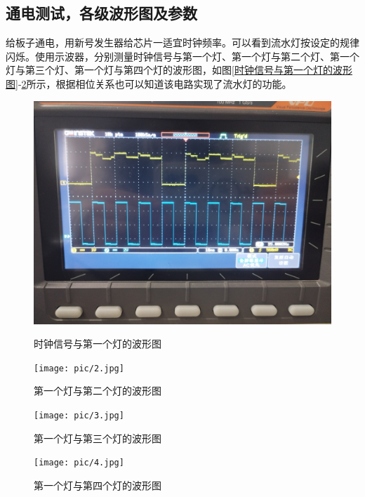 \documentclass{ctexart}
\begin{document}
\subsection{通电测试，各级波形图及参数}
给板子通电，用新号发生器给芯片一适宜时钟频率。可以看到流水灯按设定的规律闪烁。使用示波器，分别测量时钟信号与第一个灯、第一个灯与第二个灯、第一个灯与第三个灯、第一个灯与第四个灯的波形图，如图\ref{时钟信号与第一个灯的波形图}-\ref{第一个灯与第四个灯的波形图}所示，根据相位关系也可以知道该电路实现了流水灯的功能。
\begin{figure}[H]
    \centering
    \begin{minipage}{0.45\textwidth}
    \centering
           \includegraphics[width=1\textwidth]{pic/时钟与灯1.jpg}
           \caption{时钟信号与第一个灯的波形图}
    \label{时钟信号与第一个灯的波形图}
    \end{minipage}
    \hspace{0.05\textwidth}
    \begin{minipage}{0.45\textwidth}
    \centering
           \texttt{[image: pic/2.jpg]}
           \caption{第一个灯与第二个灯的波形图}
    \label{第一个灯与第二个灯的波形图}
    \end{minipage}
\end{figure}
\begin{figure}[H]
    \centering
    \begin{minipage}{0.45\textwidth}
    \centering
           \texttt{[image: pic/3.jpg]}
           \caption{第一个灯与第三个灯的波形图}
    \label{第一个灯与第三个灯的波形图}
    \end{minipage}
    \hspace{0.05\textwidth}
    \begin{minipage}{0.45\textwidth}
    \centering
           \texttt{[image: pic/4.jpg]}
           \caption{第一个灯与第四个灯的波形图}
    \label{第一个灯与第四个灯的波形图}
    \end{minipage}
\end{figure}
\end{document}
